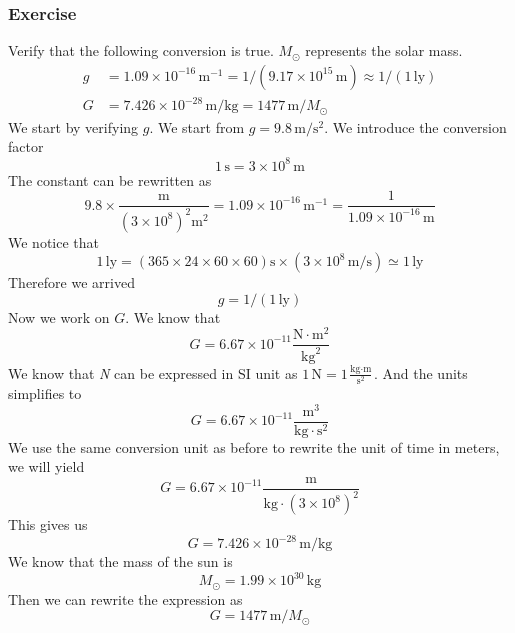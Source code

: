 \documentclass[12pt]{article}
\newcommand{\paren}[1]{\left( #1 \right)}
\begin{document}
\subsubsection{Exercise}
Verify that the following conversion is true. $M_\odot$ represents the solar mass.
\begin{align*}
g &= 1.09 \times 10^{-16} \, \text{m}^{-1} = 1 / (9.17 \times 10^{15} \, \text{m}) \approx 1 / (1 \, \text{ly})\\
G &= 7.426 \times 10^{-28} \, \text{m/kg} = 1477 \, \text{m} / M_\odot
\end{align*}
We start by verifying $g$. We start from $g = 9.8 \,\text{m/s$^2$}$. We introduce the conversion factor
\[
1\, \text{s} = 3\times 10^{8} \,\text{m}
\]
The constant can be rewritten as
\[
9.8 \times \frac{\text{m}}{\paren{3\times 10^{8}}^2\text{m}^2} =  1.09 \times 10^{-16} \, \text{m}^{-1} = \frac{1}{1.09 \times 10^{-16}\,\text{m}}
\]
We notice that
\[
1\,\text{ly} = \paren{365\times 24\times 60\times 60}\text{s} \times \paren{3\times 10^{8} \,\text{m/s}} \simeq 1\,\text{ly}
\]
Therefore we arrived 
\[
g = 1 / (1 \, \text{ly})
\]
Now we work on $G$. We know that 
\[
G = 6.67 \times 10^{-11} \frac{\text{N}\cdot\text{m}^2}{\text{kg}^2}
\]
We know that \textit{N} can be expressed in SI unit as $1\,$N$= 1\frac{\text{kg}\cdot\text{m}}{\text{s}^2}$. And the units simplifies to
\[
G = 6.67 \times 10^{-11} \frac{\text{m}^3}{\text{kg}\cdot \text{s}^2}
\]
We use the same conversion unit as before to rewrite the unit of time in meters, we will yield
\[
G = 6.67 \times 10^{-11} \frac{\text{m}}{\text{kg}\cdot \paren{3\times 10^{8}}^2}
\]
This gives us
\[
G = 7.426 \times 10^{-28}\, \text{m/kg}
\]
We know that the mass of the sun is
\[
M_\odot = 1.99 \times 10^{30}\,\text{kg}
\]
Then we can rewrite the expression as
\[
G = 1477 \, \text{m} / M_\odot
\]
\end{document}
